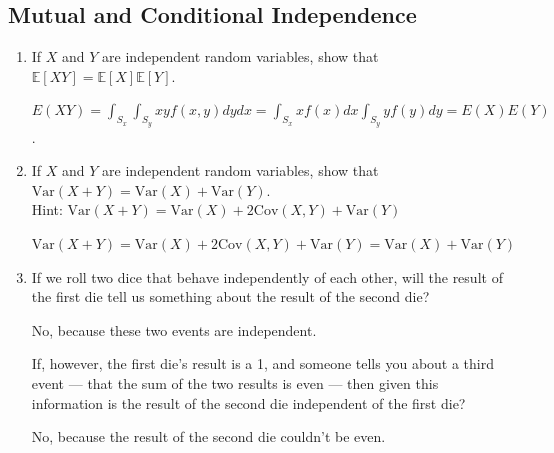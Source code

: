\documentclass[a4paper]{article}
\theoremstyle{definition}
\newcommand{\Var}{\mathrm{Var}}
\newcommand{\Cov}{\mathrm{Cov}}
\newenvironment{soln}{
    \leavevmode\color{blue}\ignorespaces
}{}
\begin{document}
\subsection{Mutual and Conditional Independence}
\begin{enumerate}
\item If $X$ and $Y$ are independent random variables, show that
  $\mathbb{E}[XY] = \mathbb{E}[X]\mathbb{E}[Y]$.
  
  \begin{soln}  $E(XY)=\int_{S_x}\int_{S_y}xyf(x,y)dydx=\int_{S_x}xf(x)dx\int_{S_y}yf(y)dy=E(X)E(Y)$.  \end{soln}
  
\item If $X$ and $Y$ are independent random variables, show that
  $\Var(X+Y) = \Var(X) + \Var(Y)$. \\
  Hint: $\Var(X+Y) = \Var(X) + 2\Cov(X, Y) + \Var(Y)$
  
  \begin{soln} $\Var(X+Y) = \Var(X) + 2\Cov(X, Y) + \Var(Y)= \Var(X) + \Var(Y)$ \end{soln}
 
\item If we roll two dice that behave independently of each
  other, will the result of the first die tell us something about the
  result of the second die? 
  
  \begin{soln}  No, because these two events are independent. \end{soln}
  
  If, however, the first die's result is a 1,
  and someone tells you about a third event --- that the sum of the two
  results is even --- then given this information is the result of the second die
  independent of the first die? 
  
  \begin{soln}  No, because the result of the second die couldn't be even. \end{soln}
\end{enumerate}
\end{document}
